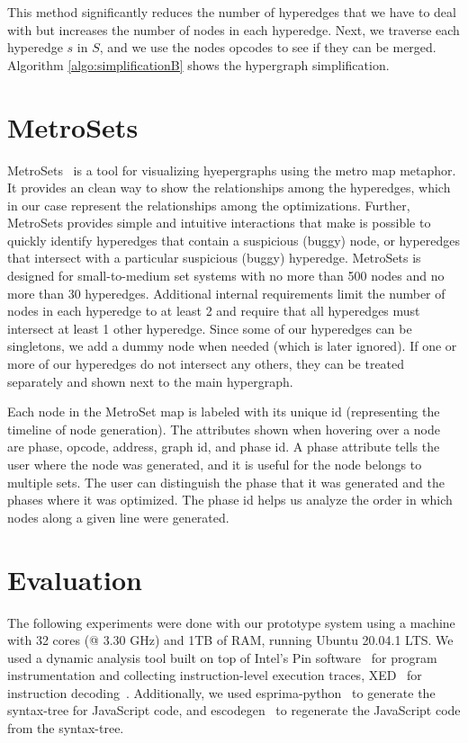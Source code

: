 \documentclass[runningheads]{llncs}
\begin{document}
This method significantly reduces the number of hyperedges that we have to deal with but increases the number of nodes in each hyperedge. Next, we traverse each hyperedge $s$ in $S$, and we use the nodes opcodes to see if they can be merged. Algorithm \ref{algo:simplificationB} shows the hypergraph simplification.
%
\section{MetroSets}\label{sec:metroset}

MetroSets~\cite{DBLP:journals/tvcg/JacobsenWKN21} is a tool for visualizing hyepergraphs using the  metro map metaphor. It provides an clean way to show the relationships among the hyperedges, which in our case represent the relationships among the optimizations. Further, MetroSets provides simple and intuitive interactions that make is possible to quickly identify hyperedges that contain a suspicious (buggy) node, or hyperedges that intersect with a particular suspicious (buggy) hyperedge. MetroSets is designed for small-to-medium set systems with no more than 500 nodes and no more than 30 hyperedges. Additional internal requirements limit the number of nodes in each hyperedge to at least 2 and require that all hyperedges must intersect at least 1 other hyperedge. Since some of our hyperedges can be singletons, we add a dummy node when needed (which is later ignored). If one or more of our hyperedges do not intersect any others, they can be treated separately and shown next to the main hypergraph.

Each node in the MetroSet map is labeled with its unique id (representing the timeline of node generation). The attributes shown when hovering over a node are phase, opcode, address, graph id, and phase id. A phase attribute tells the user where the node was generated, and it is useful for the node belongs to multiple sets. The user can distinguish the phase that it was generated and the phases where it was optimized. The phase id helps us analyze the order in which nodes along a given line were generated.

\section{Evaluation}\label{sec:evaluation}

The following experiments were done with our prototype system using a machine with 32 cores (@ 3.30 GHz) and 1TB of RAM, running Ubuntu 20.04.1 LTS. We used a dynamic analysis tool built on top of Intel's Pin software~\cite{DBLP:conf/pldi/LukCMPKLWRH05} for program instrumentation and collecting instruction-level execution traces, XED~\cite{xed} for instruction decoding~\cite{xed}. Additionally, we used esprima-python~\cite{esprima} to generate the syntax-tree for JavaScript code, and escodegen~\cite{escodegen} to regenerate the JavaScript code from the syntax-tree. 
\end{document}
